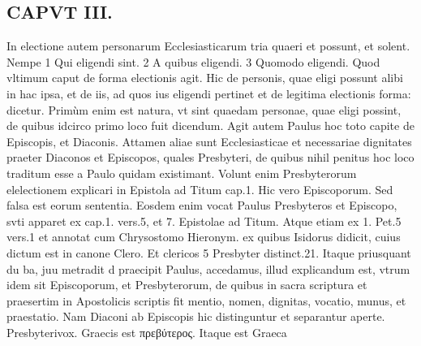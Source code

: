 \documentclass{article}
\begin{document}
\begin{pages}
\section*{CAPVT  III. }
\marginpar{[ p.85 ]}\pstart In electione autem personarum Ecclesiasticarum tria quaeri et possunt, et solent. Nempe 1 Qui eligendi sint. 2 A quibus eligendi. 3 Quomodo eligendi. Quod vltimum caput de forma electionis agit. Hic de personis, quae eligi possunt alibi in hac ipsa, et de iis, ad quos ius eligendi pertinet et de legitima electionis forma: dicetur. Primùm enim est natura, vt sint quaedam personae, quae eligi possint, de quibus idcirco primo loco fuit dicendum.  \pend\pstart Agit autem Paulus hoc toto capite de Episcopis, et Diaconis. Attamen aliae sunt Ecclesiasticae et necessariae dignitates praeter Diaconos et Episcopos, quales Presbyteri, de quibus nihil penitus hoc loco traditum esse a Paulo quidam existimant. Volunt enim Presbyterorum elelectionem explicari in Epistola ad Titum cap.1. Hic vero Episcoporum. Sed falsa est eorum sententia. Eosdem enim vocat Paulus Presbyteros et Episcopo, svti apparet ex cap.1. vers.5, et 7. Epistolae ad Titum. Atque etiam ex 1. Pet.5 vers.1 et annotat cum Chrysostomo Hieronym. ex quibus Isidorus didicit, cuius dictum est in canone Clero. Et clericos 5 Presbyter distinct.21. Itaque priusquant du ba, juu metradit d praecipit Paulus, accedamus, illud explicandum est, vtrum idem sit Episcoporum, et Presbyterorum, de quibus in sacra scriptura et praesertim in Apostolicis scriptis fit mentio, nomen, dignitas, vocatio, munus, et praestatio. Nam Diaconi ab Episcopis hic distinguntur et separantur aperte. Presbyterivox. Graecis est πρεβύτερος. Itaque est Graeca  \pend

\end{pages}
\end{document}

